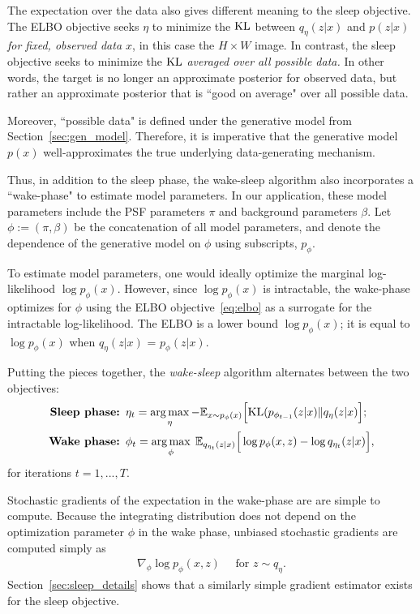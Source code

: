 The expectation over the data also gives different meaning to the sleep objective. The ELBO objective seeks $\eta$ to minimize the $\textrm{KL}$ between $q_\eta(z | x)$ and $p(z | x)$ {\itshape for fixed, observed data $x$},
in this case the $H\times W$ image. In contrast, the sleep objective seeks to minimize the $\textrm{KL}$ {\itshape averaged over all possible data. } In other words, the target is no longer an approximate posterior for observed data, but rather an approximate posterior that is ``good on average" over all possible data.

Moreover, ``possible data" is defined under the generative model from Section~\ref{sec:gen_model}. Therefore, it is imperative that the generative model $p(x)$ well-approximates the true underlying data-generating mechanism. 

Thus, in addition to the sleep phase, the wake-sleep algorithm also incorporates a ``wake-phase" to estimate model parameters.
In our application, these model parameters include the PSF parameters $\pi$ and background parameters $\beta$. Let 
$\phi:=(\pi, \beta)$ be the concatenation of all model parameters, and denote the dependence of the generative model on $\phi$ using subscripts, $p_\phi$. 

To estimate model parameters, one would ideally optimize the marginal log-likelihood $\log p_\phi(x)$.
However, since $\log p_\phi(x)$ is intractable, the wake-phase optimizes for $\phi$ using the ELBO objective~\eqref{eq:elbo}
as a surrogate for the intractable log-likelihood. 
The ELBO is a lower bound
$\log p_\phi(x)$; it is equal to $\log p_\phi(x)$ when $q_\eta(z | x)$ 
= $p_\phi(z | x)$. 

Putting the pieces together, the {\itshape wake-sleep} algorithm alternates between the two objectives: 
\begin{align}
    \text{{\bf Sleep phase: }} & 
    \eta_{t} = \operatorname*{arg\,max}_{\eta} -\mathbb{E}_{x \sim p_\phi(x)}\Big[\textrm{KL}(p_{\phi_{t-1}}(z | x) \| q_\eta(z | x)\Big]
    \label{eq:sleep_phase_summary}; 
    \\
    \text{{\bf Wake phase: }} & \phi_{t} = \operatorname*{arg\,max}_{\phi}\; \mathbb{E}_{q_{\eta_t}(z | x)}\Big[\log p_{\phi}(x, z) - \log q_{\eta_t}(z | x)\Big],
    \label{eq:wake_phase_summary}
\end{align} 
for iterations $t = 1, ..., T$. 

Stochastic gradients of the expectation in the wake-phase are are simple to compute. Because the integrating distribution does not depend on the optimization parameter $\phi$ in the wake phase, unbiased stochastic gradients are computed simply as 
\begin{align}
    \nabla_\phi \log p_\phi(x, z) \quad \text{ for } z\sim q_\eta. 
    \label{eq:mstep_grad}
\end{align}
Section~\ref{sec:sleep_details} shows that a similarly simple gradient estimator exists for the sleep objective.


